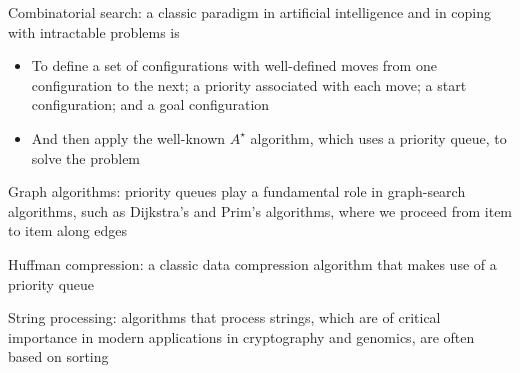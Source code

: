 \documentclass[8pt,a4paper,compress]{beamer}
\begin{document}
\begin{frame}[fragile]
\pause

Combinatorial search: a classic paradigm in artificial intelligence and in coping with intractable problems is
\begin{itemize}
\item To define a set of configurations with well-defined moves from one configuration to the next; a priority associated with each move; a start configuration; and a goal configuration  

\item And then apply the well-known $A^\star$ algorithm, which uses a priority queue, to solve the problem
\end{itemize}

\pause
\bigskip

Graph algorithms: priority queues play a fundamental role in graph-search algorithms, such as Dijkstra's and Prim's algorithms, where we proceed from item to item along edges

\pause
\bigskip

Huffman compression: a classic data compression algorithm that makes use of a priority queue

\pause
\bigskip

String processing: algorithms that process strings, which are of critical importance in modern applications in cryptography and genomics, are often based on sorting
\end{frame}
\end{document}
